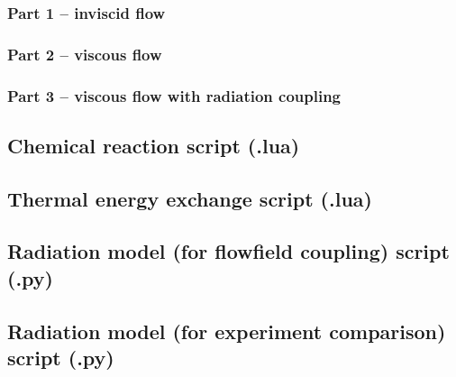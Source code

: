 \subsubsection{Part 1 -- inviscid flow}

\topbar

\bottombar

\subsubsection{Part 2 -- viscous flow}

\topbar

\bottombar

\subsubsection{Part 3 -- viscous flow with radiation coupling}

\topbar

\bottombar

\clearpage

\subsection{Chemical reaction script (.lua)}

\topbar

\bottombar

\subsection{Thermal energy exchange script (.lua)}

\topbar

\bottombar

\subsection{Radiation model (for flowfield coupling) script (.py)}

\topbar

\bottombar

\subsection{Radiation model (for experiment comparison) script (.py)}

